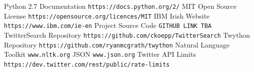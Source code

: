 \documentclass[12pt,a4paper]{report}
\begin{document}
\begin{thebibliography}{8}
Python 2.7 Documentation
\texttt{https://docs.python.org/2/}
MIT Open Source License
\texttt{https://opensource.org/licences/MIT}
IBM Irish Website
\texttt{https://www.ibm.com/ie-en}
Project Source Code
\texttt{GITHUB LINK TBA}
TwitterSearch Repository
\texttt{https://github.com/ckoepp/TwitterSearch}
Twython Repository
\texttt{https://github.com/ryanmcgrath/twython}
Natural Language Toolkit
\texttt{www.nltk.org}
JSON 
\texttt{www.json.org}
Twitter API Limits
\texttt{https://dev.twitter.com/rest/public/rate-limits}
\end{thebibliography}
\end{document}
